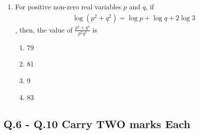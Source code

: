 \documentclass[journal]{IEEEtran}
\theoremstyle{remark}
\begin{document}
\begin{enumerate}
\item For positive non-zero real variables $p$ and $q$, if 
\begin{align}
    \log(p^2+q^2) = \log p + \log q + 2\log 3
\end{align}
, then, the value of $\frac{p^4+q^4}{p^2q^2}$ is \hfill{}
\begin{multicols}{4}
\begin{enumerate}
\item 79
\item 81
\item 9
\item 83
\end{enumerate}
\end{multicols}
\end{enumerate}

\subsection*{Q.6 - Q.10 Carry TWO marks Each}
\end{document}

